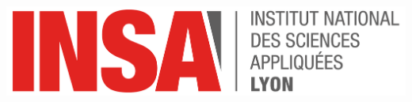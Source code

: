 \documentclass[12pt]{article}
\begin{document}
\begin{titlepage}
\includegraphics[scale=0.3]{figures/logo.png}

\vfill %

\end{titlepage}
\end{document}
